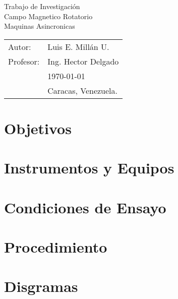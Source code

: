\documentclass[11pt,letterpaper]{article}
\begin{document}
\newpage
\pagestyle{fancy}
\fancyhf{}
\vspace*{6cm}
\begin{center}
\Huge  {Trabajo de Investigación}\\
\Huge  {Campo Magnetico Rotatorio}\\
\Huge  {Maquinas Asincronicas}\\
\vspace{1cm}
\end{center}
\vfill
\begin{flushright}
\begin{tabular}{ll}
Autor: & Luis E. Millán U.\\
Profesor: & Ing. Hector Delgado\\
& \today\\
& Caracas, Venezuela.
\end{tabular}
\end{flushright}

\newpage
\pagestyle{fancy}
\fancyhf{}
\fancyhead[L]{\rightmark}
\fancyhead[R]{\small \rm \textbf{\thepage}}
\renewcommand{\sectionmark}[1]{\markright{\thesection.\ #1}}
\renewcommand{\headrulewidth}{0.5pt}
\renewcommand{\footrulewidth}{0.5pt}
\tableofcontents
\newpage
\section{Objetivos}
\section{Instrumentos y Equipos}
\section{Condiciones de Ensayo}
\section{Procedimiento}
\section{Disgramas}
\end{document}
